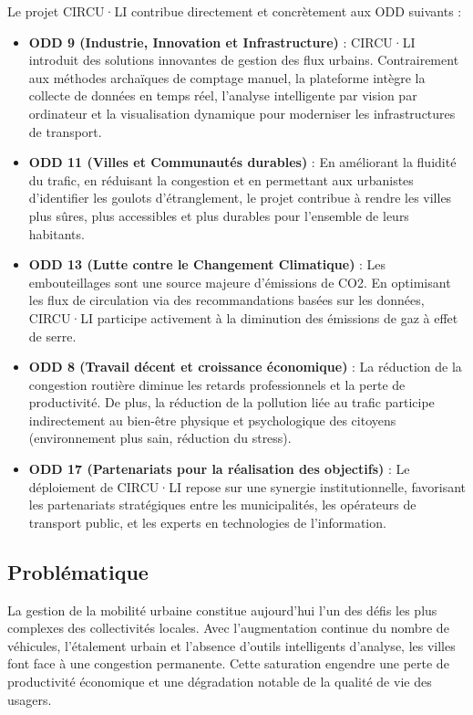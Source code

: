 Le projet CIRCU·LI contribue directement et concrètement aux ODD suivants :
\begin{itemize}
    \item \textbf{ODD 9 (Industrie, Innovation et Infrastructure)} : CIRCU·LI introduit des solutions innovantes de gestion des flux urbains. Contrairement aux méthodes archaïques de comptage manuel, la plateforme intègre la collecte de données en temps réel, l’analyse intelligente par vision par ordinateur et la visualisation dynamique pour moderniser les infrastructures de transport.
    \item \textbf{ODD 11 (Villes et Communautés durables)} : En améliorant la fluidité du trafic, en réduisant la congestion et en permettant aux urbanistes d'identifier les goulots d'étranglement, le projet contribue à rendre les villes plus sûres, plus accessibles et plus durables pour l'ensemble de leurs habitants.
    \item \textbf{ODD 13 (Lutte contre le Changement Climatique)} : Les embouteillages sont une source majeure d'émissions de CO2. En optimisant les flux de circulation via des recommandations basées sur les données, CIRCU·LI participe activement à la diminution des émissions de gaz à effet de serre.
    \item \textbf{ODD 8 (Travail décent et croissance économique)} : La réduction de la congestion routière diminue les retards professionnels et la perte de productivité. De plus, la réduction de la pollution liée au trafic participe indirectement au bien-être physique et psychologique des citoyens (environnement plus sain, réduction du stress).
    \item \textbf{ODD 17 (Partenariats pour la réalisation des objectifs)} : Le déploiement de CIRCU·LI repose sur une synergie institutionnelle, favorisant les partenariats stratégiques entre les municipalités, les opérateurs de transport public, et les experts en technologies de l'information.
\end{itemize}

\subsection{Problématique}
La gestion de la mobilité urbaine constitue aujourd’hui l’un des défis les plus complexes des collectivités locales. Avec l’augmentation continue du nombre de véhicules, l’étalement urbain et l’absence d’outils intelligents d’analyse, les villes font face à une congestion permanente. Cette saturation engendre une perte de productivité économique et une dégradation notable de la qualité de vie des usagers. 

